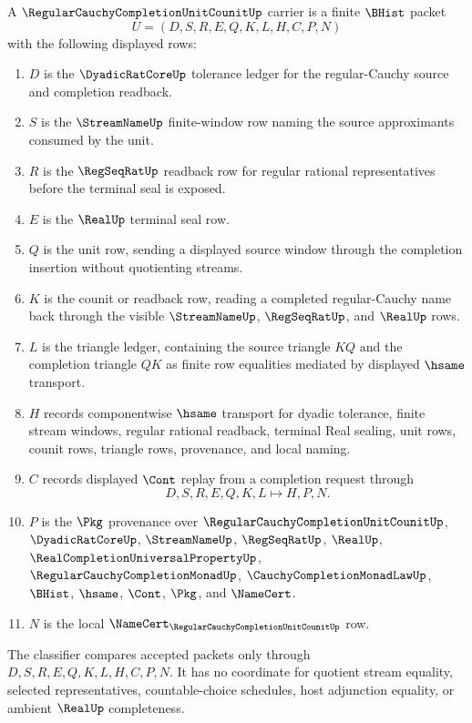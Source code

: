 \begin{definition}
\label{def:regular-cauchy-completion-unit-counit-packet}
A $\RegularCauchyCompletionUnitCounitUp$ carrier is a finite $\BHist$ packet
$$
U=(D,S,R,E,Q,K,L,H,C,P,N)
$$
with the following displayed rows:
\begin{enumerate}
\item $D$ is the $\DyadicRatCoreUp$ tolerance ledger for the regular-Cauchy source and completion readback.
\item $S$ is the $\StreamNameUp$ finite-window row naming the source approximants consumed by the unit.
\item $R$ is the $\RegSeqRatUp$ readback row for regular rational representatives before the terminal seal is exposed.
\item $E$ is the $\RealUp$ terminal seal row.
\item $Q$ is the unit row, sending a displayed source window through the completion insertion without quotienting streams.
\item $K$ is the counit or readback row, reading a completed regular-Cauchy name back through the visible $\StreamNameUp$, $\RegSeqRatUp$, and $\RealUp$ rows.
\item $L$ is the triangle ledger, containing the source triangle $KQ$ and the completion triangle $QK$ as finite row equalities mediated by displayed $\hsame$ transport.
\item $H$ records componentwise $\hsame$ transport for dyadic tolerance, finite stream windows, regular rational readback, terminal Real sealing, unit rows, counit rows, triangle rows, provenance, and local naming.
\item $C$ records displayed $\Cont$ replay from a completion request through
$$
D,S,R,E,Q,K,L \longmapsto H,P,N .
$$
\item $P$ is the $\Pkg$ provenance over $\RegularCauchyCompletionUnitCounitUp$, $\DyadicRatCoreUp$, $\StreamNameUp$, $\RegSeqRatUp$, $\RealUp$, $\RealCompletionUniversalPropertyUp$, $\RegularCauchyCompletionMonadUp$, $\CauchyCompletionMonadLawUp$, $\BHist$, $\hsame$, $\Cont$, $\Pkg$, and $\NameCert$.
\item $N$ is the local $\NameCert_{\RegularCauchyCompletionUnitCounitUp}$ row.
\end{enumerate}
The classifier compares accepted packets only through $D,S,R,E,Q,K,L,H,C,P,N$. It has no coordinate for quotient stream equality, selected representatives, countable-choice schedules, host adjunction equality, or ambient $\RealUp$ completeness.
\end{definition}

